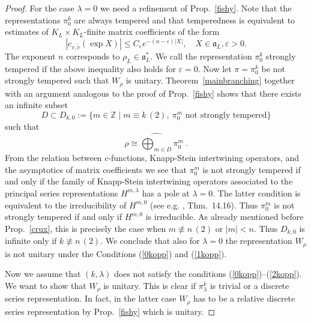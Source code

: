 \documentclass[10]{amsart}
\theoremstyle{remark}
\theoremstyle{definition}
\numberwithin{equation}{section}
\newcommand{\Z}{\mathbb{Z}}         %
\newcommand{\fa}{{\mathfrak a}}             %
\newcommand{\ve}{\varepsilon}
\begin{document}
{\begin{proof}
For the case $\lambda=0$ we need a refinement of Prop.~\ref{fishy}.
Note that the representations $\pi_0^k$ are always tempered and that temperedness is equivalent to estimates of $K_L\times K_L$-finite matrix coefficients of the form
$$   |c_{v,\tilde v}(\exp X)|\le C_\ve e^{-(n-\ve)|X|},\quad X\in\fa_L, \ve>0.$$
The exponent $n$ corresponds to $\rho_L\in \fa_L^*$. We call the representation $\pi_0^k$ strongly tempered if the above inequality also holds for $\ve=0$.
Now let  $\pi=\pi^k_0$ be not strongly tempered such that $W_\rho$ is unitary. Theorem~\ref{mainbranching} together with an argument analogous to the proof of Prop.~\ref{fishy} shows that there exists an infinite subset 
$$D\subset D_{k,0}:=\{m\in\Z\mid m\equiv k\, (2),\:  \pi_0^m \mbox{ not strongly tempered}\}$$
such that 
$$\rho\cong \widehat{\bigoplus_{m\in D}} \pi_0^m\ .$$
From the relation between $c$-functions, Knapp-Stein intertwining operators, and the asymptotics of matrix coefficients we see  that  $\pi^m_0$
is not strongly tempered if and only if the family of Knapp-Stein intertwining operators associated to the principal series representations $H^{m,\lambda}$ has a pole  at $\lambda=0$.
The latter condition is equivalent to the irreducibility of $H^{m,0}$
(see e.g. \cite{Kn86}, Thm.~14.16). Thus $\pi^m_0$
is not strongly tempered if and only if $H^{m,0}$ is irreducible. As already mentioned before Prop.~\ref{crux}, this is precisely the case when $m\not\equiv n\, (2)$ or $|m|<n$. 
Thus $D_{k,0}$ is infinite only if $k\not\equiv n\, (2)$. We conclude
that also for $\lambda= 0$  the representation $W_\rho$ is not unitary under the Conditions (\ref{0kopp}) and (\ref{1kopp}). 

Now we assume that $(k,\lambda)$ does not satisfy the conditions (\ref{0kopp})--(\ref{2kopp}). We want to show that $W_\rho$ is unitary. This is clear if $\pi_\lambda^k$ is trivial
or a discrete series representation. In fact, in the latter case $W_\rho$ has to be a relative discrete series representation by Prop.~\ref{fishy} which is unitary.


\end{proof}}
\end{document}
